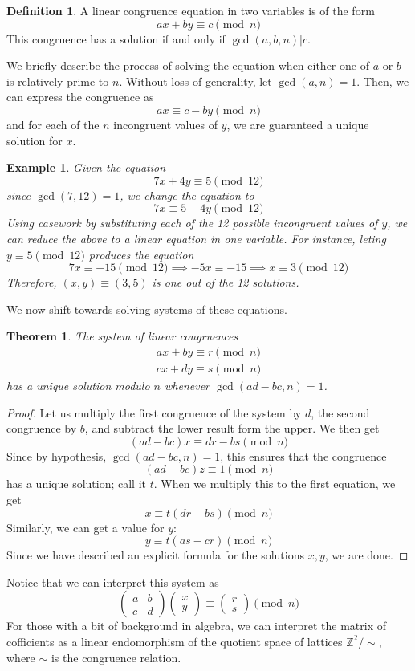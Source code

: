 \documentclass{article}
\newtheorem{theorem}{Theorem}[section]
\newtheorem{example}{Example}[section]
\theoremstyle{remark}
\theoremstyle{definition}
\newtheorem{definition}{Definition}[section]
\begin{document}
\begin{definition}
A linear congruence equation in two variables is of the form 
\[ax + by \equiv c \pmod{n}\]
This congruence has a solution if and only if $\gcd(a, b, n) | c$. 
\end{definition}

We briefly describe the process of solving the equation when either one of $a$ or $b$ is relatively prime to $n$. Without loss of generality, let $\gcd(a, n) = 1$. Then, we can express the congruence as 
\[ax \equiv c - by \pmod{n}\]
and for each of the $n$ incongruent values of $y$, we are guaranteed a unique solution for $x$. 

\begin{example}
Given the equation 
\[7x + 4y \equiv 5 \pmod{12}\]
since $\gcd(7, 12) = 1$, we change the equation to 
\[7x \equiv 5 - 4y \pmod{12}\]
Using casework by substituting each of the 12 possible incongruent values of $y$, we can reduce the above to a linear equation in one variable. For instance, leting $y \equiv 5 \pmod{12}$ produces the equation
\[7x \equiv -15 \pmod{12} \implies -5x \equiv -15 \implies x \equiv 3 \pmod{12}\]
Therefore, $(x, y) \equiv (3, 5)$ is one out of the 12 solutions. 
\end{example}

We now shift towards solving systems of these equations. 

\begin{theorem}
The system of linear congruences
\begin{align*}
    ax + by \equiv r \pmod{n} \\
    cx + dy \equiv s \pmod{n}
\end{align*}
has a unique solution modulo $n$ whenever $\gcd(ad-bc, n) = 1$. 
\end{theorem}
\begin{proof}
Let us multiply the first congruence of the system by $d$, the second congruence by $b$, and subtract the lower result form the upper. We then get
\[(ad-bc) x \equiv dr - bs \pmod{n}\]
Since by hypothesis, $\gcd(ad-bc, n) = 1$, this ensures that the congruence 
\[(ad - bc) z \equiv 1 \pmod{n}\]
has a unique solution; call it $t$. When we multiply this to the first equation, we get 
\[x \equiv t (dr - bs) \pmod{n}\]
Similarly, we can get a value for $y$:
\[y \equiv t (as - cr) \pmod{n}\]
Since we have described an explicit formula for the solutions $x, y$, we are done. 
\end{proof}

Notice that we can interpret this system as
\[\begin{pmatrix}
a & b\\c&d
\end{pmatrix} \begin{pmatrix}
x \\ y
\end{pmatrix} \equiv \begin{pmatrix}
r \\ s
\end{pmatrix} \pmod{n}\]
For those with a bit of background in algebra, we can interpret the matrix of cofficients as a linear endomorphism of the quotient space of lattices $\mathbb{Z}^2 / \sim$, where $\sim$ is the congruence relation. 
\end{document}
